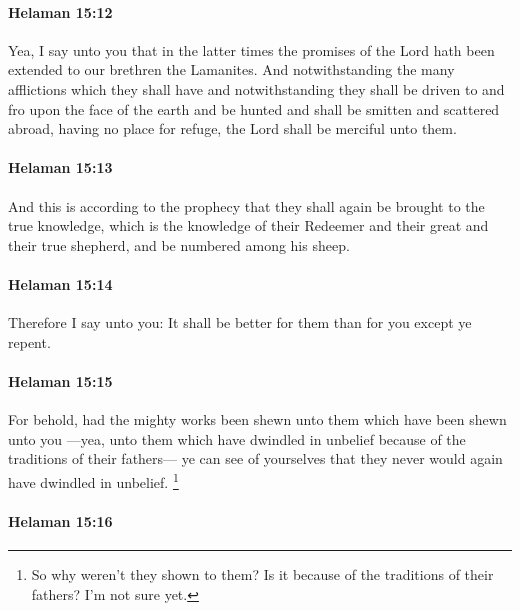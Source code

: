 		\paragraph{Helaman 15:12} %
			\label{HELAMAN-15-12}

			Yea, I say unto you that in the latter times
			the promises of the Lord hath been extended to our brethren the Lamanites.
			And notwithstanding the many afflictions which they shall have
			and notwithstanding they shall be driven to and fro upon the face of the earth
			and be hunted and shall be smitten and scattered abroad,
			having no place for refuge,
			the Lord shall be merciful unto them.

		\paragraph{Helaman 15:13} %
			\label{HELAMAN-15-13}

			And this is according to the prophecy
			that they shall again be brought to the true knowledge,
			which is the knowledge of their Redeemer
			and their great and their true shepherd,
			and be numbered among his sheep.

		\paragraph{Helaman 15:14} %
			\label{HELAMAN-15-14}

			Therefore I say unto you:
			It shall be better for them than for you except ye repent.

		\paragraph{Helaman 15:15} %
			\label{HELAMAN-15-15}

			For behold, had the mighty works been shewn unto them
			which have been shewn unto you
			---yea, unto them which have dwindled in unbelief
			because of the traditions of their fathers---
			ye can see of yourselves
			that they never would again have dwindled in unbelief.%
				\footnote{%
					So why weren't they shown to them? Is it because of the traditions of their fathers? I'm not sure yet.
					}

		\paragraph{Helaman 15:16} %
			\label{HELAMAN-15-16}

